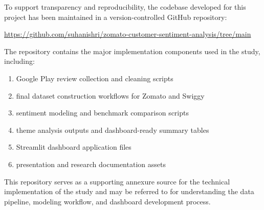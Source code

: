 To support transparency and reproducibility, the codebase developed for this project has been maintained in a version-controlled GitHub repository:

\url{https://github.com/suhanishri/zomato-customer-sentiment-analysis/tree/main}

The repository contains the major implementation components used in the study, including:

\begin{enumerate}[label=\arabic*.]
    \item Google Play review collection and cleaning scripts
    \item final dataset construction workflows for Zomato and Swiggy
    \item sentiment modeling and benchmark comparison scripts
    \item theme analysis outputs and dashboard-ready summary tables
    \item Streamlit dashboard application files
    \item presentation and research documentation assets
\end{enumerate}

This repository serves as a supporting annexure source for the technical implementation of the study and may be referred to for understanding the data pipeline, modeling workflow, and dashboard development process.

